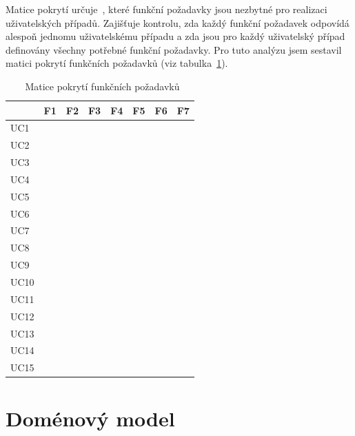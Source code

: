 Matice pokrytí určuje~\cite{uml_2007}, které funkční požadavky jsou nezbytné pro realizaci uživatelských případů. 
Zajišťuje kontrolu, zda každý funkční požadavek odpovídá alespoň jednomu uživatelskému případu a zda jsou pro každý uživatelský případ definovány všechny potřebné funkční požadavky. 
Pro tuto analýzu jsem sestavil matici pokrytí funkčních požadavků (viz tabulka~\ref{tabular:maticePokryti}).

\renewcommand{\c}{\checkmark}

\begin{table}[ht!]
\centering
\caption[Matice pokrytí funkčních požadavků]{~Matice pokrytí funkčních požadavků}\label{tabular:maticePokryti}
\begin{tabular}{l|c|c|c|c|c|c|c}
     ~         & F1 & F2 & F3 & F4 & F5 & F6 & F7 \\\hline\hline
     UC1       & \c &    &    &    &    &    &    \\\hline
     UC2       & \c &    &    &    &    &    &    \\\hline
     UC3       &    & \c & \c &    &    &    &    \\\hline
     UC4       & \c & \c &    &    &    &    &    \\\hline
     UC5       &    & \c & \c & \c & \c & \c &    \\\hline
     UC6       &    & \c & \c &    &    &    &    \\\hline
     UC7       & \c & \c &    &    &    &    &    \\\hline
     UC8       & \c &    &    &    &    &    &    \\\hline
     UC9       & \c &    & \c &    &    &    &    \\\hline
     UC10      & \c &    &    &    &    &    &    \\\hline
     UC11      &    & \c & \c &    & \c &    &    \\\hline
     UC12      & \c &    & \c &    &    & \c &    \\\hline
     UC13      & \c &    & \c &    &    & \c &    \\\hline
     UC14      & \c & \c &    & \c &    &    & \c \\\hline
     UC15      & \c & \c &    & \c &    &    & \c \\
\end{tabular}
\end{table}


\section{Doménový model}

